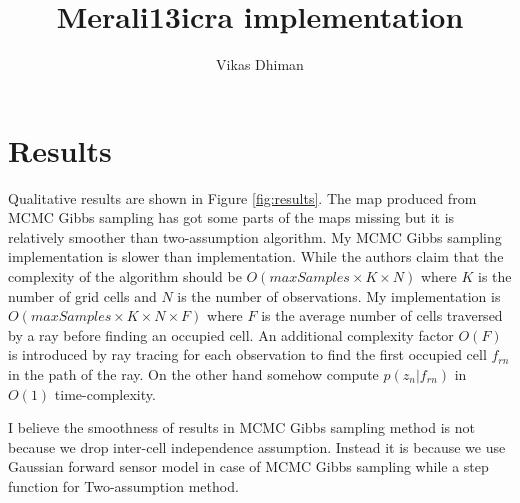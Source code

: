 \documentclass[10pt,oneside,letterpaper]{article}
\title{Merali13icra implementation}
\author{Vikas Dhiman}
\begin{document}
\maketitle

\section{Results}
Qualitative results are shown in Figure \ref{fig:results}. The map produced from MCMC Gibbs sampling has got some parts of the maps missing but it is relatively smoother than two-assumption algorithm. My MCMC Gibbs sampling implementation is slower than \cite{merali2013icra} implementation. While the authors claim that the complexity of the algorithm should be $O(maxSamples \times K \times N)$ where $K$ is the number of grid cells and $N$ is the number of observations. My implementation is $O(maxSamples \times K \times N \times F)$ where $F$ is the average number of cells traversed by a ray before finding an occupied cell. An additional complexity factor $O(F)$ is introduced by ray tracing for each observation to find the first occupied cell $f_{rn}$ in the path of the ray. On the other hand \cite{merali2013icra} somehow compute $p(z_n|f_{rn})$ in $O(1)$ time-complexity.

I believe the smoothness of results in MCMC Gibbs sampling method is not because we drop inter-cell independence assumption. Instead it is because we use Gaussian forward sensor model in case of MCMC Gibbs sampling while a step function for Two-assumption method.
\end{document}
